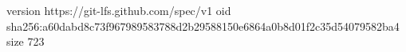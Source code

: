 version https://git-lfs.github.com/spec/v1
oid sha256:a60dabd8c73f967989583788d2b29588150e6864a0b8d01f2c35d54079582ba4
size 723
